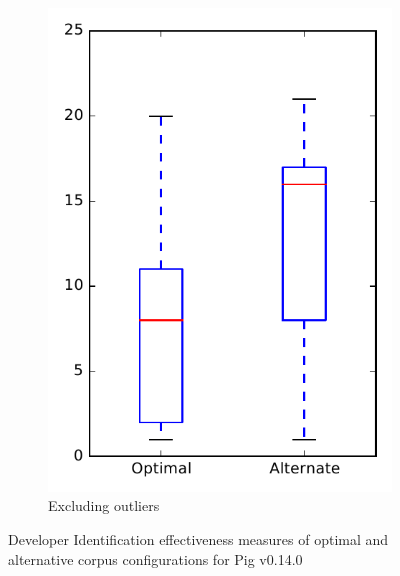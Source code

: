\begin{figure}
\begin{subfigure}{.4\textwidth}
        \includegraphics[height=0.4\textheight]{figures/combo/dit_rq2_pig_no_outlier}
        \caption{Excluding outliers}\label{fig:combo:dit:rq2:pig_no_outlier}
    \end{subfigure}
\caption{Developer Identification effectiveness measures of optimal and alternative corpus configurations for Pig v0.14.0}
\label{fig:combo:dit:rq2:pig}
\end{figure}
